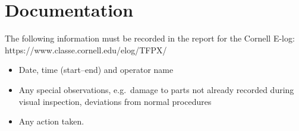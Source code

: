 \documentclass[12pt]{cornelltfpxsop}
\begin{document}
\section{Documentation}
The following information must be recorded in the report for the Cornell E-log:\\ https://www.classe.cornell.edu/elog/TFPX/
\begin{itemize}
    \item Date, time (start--end) and operator name
    \item Any special observations, e.g.~damage to parts not already recorded during visual inspection, deviations from normal procedures
    \item Any action taken.
\end{itemize}
\end{document}
